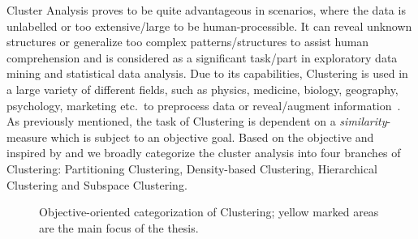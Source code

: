 Cluster Analysis proves to be quite advantageous in scenarios, where the data is unlabelled or too extensive/large to be human-processible. It can reveal unknown structures or generalize too complex patterns/structures to assist human comprehension and is considered as a significant task/part in exploratory data mining and statistical data analysis. Due to its capabilities, Clustering is used in a large variety of different fields, such as physics, medicine, biology, geography, psychology, marketing etc.\ to preprocess data or reveal/augment information~\cite{kriegel2009clustering}.
As previously mentioned, the task of Clustering is dependent on a \textit{similarity}-measure which is subject to an objective goal. Based on the objective and inspired by \textcite{validationhalkidi2001clustering} and \textcite[Ch.10.1.3]{han2011data} we broadly categorize the cluster analysis into four branches of Clustering: Partitioning Clustering, Density-based Clustering, Hierarchical Clustering and Subspace Clustering. 

\begin{figure}
    \centering
    \caption{Objective-oriented categorization of Clustering; yellow marked areas are the main focus of the thesis.}
    \label{fig:clusteringtree}
\end{figure}


